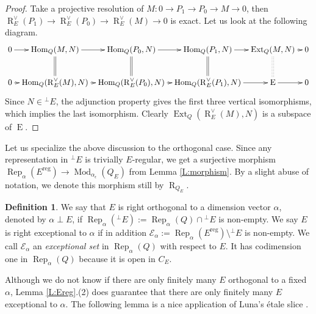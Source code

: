 \documentclass{amsart}
\theoremstyle{definition}
\newtheorem{definition}[theorem]{Definition}
\theoremstyle{remark}
\numberwithin{equation}{section}
\begin{document}
\begin{proof}
Take a projective resolution of $M:0\to P_1\to P_0\to M\to 0$, then ${\operatorname{R}}_E^\vee(P_1)\to {\operatorname{R}}_E^\vee(P_0)\to {\operatorname{R}}_E^\vee(M)\to 0$ is exact.  Let us look at the following diagram.
$$\xymatrix @C=0.5pc {
0 \ar[r] & {\operatorname{Hom}}_Q(M,N) \ar[r]\ar@{=}[d] &  {\operatorname{Hom}}_Q(P_0,N) \ar[r]\ar@{=}[d] & {\operatorname{Hom}}_Q(P_1,N) \ar[r] \ar@{=}[d] & {\operatorname{Ext}}_Q(M,N) \ar[r] \ar@{:}[d] & 0 \\
0 \ar[r] & {\operatorname{Hom}}_{Q}({\operatorname{R}}_E^\vee(M),N) \ar[r] & {\operatorname{Hom}}_{Q}({\operatorname{R}}_E^\vee(P_0),N) \ar[r] & {\operatorname{Hom}}_{Q}({\operatorname{R}}_E^\vee(P_1),N) \ar[r] & {\operatorname{E}} \ar[r] & 0 \\
}$$
Since $N\in {{^\perp}\!} E$, the adjunction property gives the first three vertical isomorphisms, which implies the last isomorphism. Clearly ${\operatorname{Ext}}_{Q}({\operatorname{R}}_E^\vee(M),N)$ is a subspace of ${\operatorname{E}}$.
\end{proof}

Let us specialize the above discussion to the orthogonal case. Since any representation in ${{^\perp}\!} E$ is trivially $E$-regular, we get a surjective morphism ${\operatorname{Rep}}_\alpha(E^{{\operatorname{reg}}})\to{\operatorname{Mod}}_{\alpha_\epsilon}(Q_E)$ from Lemma \ref{L:morphism}. By a slight abuse of notation, we denote this morphism still by ${\operatorname{R}}_{Q_E}$.

\begin{definition} \label{D:exc}
We say that $E$ is right orthogonal to a dimension vector $\alpha$, denoted by $\alpha\perp E$, if ${\operatorname{Rep}}_\alpha({{^\perp}\!} E):={\operatorname{Rep}}_\alpha(Q)\cap {^\perp} E$ is non-empty. We say $E$ is right exceptional to $\alpha$ if in addition ${\mathcal{{E}}}_\alpha:={\operatorname{Rep}}_\alpha(E^{{\operatorname{reg}}})\setminus{{^\perp}\!} E$ is non-empty. We call ${\mathcal{{E}}}_\alpha$ an {\em exceptional set} in ${\operatorname{Rep}}_\alpha(Q)$ with respect to $E$. It has codimension one in ${\operatorname{Rep}}_\alpha(Q)$ because it is open in $C_E$.
\end{definition}

Although we do not know if there are only finitely many $E$ orthogonal to a fixed $\alpha$, Lemma \ref{L:Ereg}.(2) does guarantee that there are only finitely many $E$ exceptional to $\alpha$.
The following lemma is a nice application of Luna's \'{e}tale slice \cite{Lu}.
\end{document}
